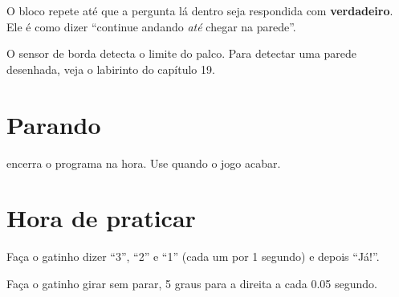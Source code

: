 O bloco  repete até que a pergunta lá dentro seja respondida com \textbf{verdadeiro}. Ele é como dizer ``continue andando \emph{até} chegar na parede''.

\begin{codigo}
\begin{pilha}
\sbcend
\end{pilha}
\end{codigo}

O sensor de borda detecta o limite do palco. Para detectar uma parede desenhada, veja o labirinto do capítulo 19.

\section{Parando}

 encerra o programa na hora. Use quando o jogo acabar.

\section{Hora de praticar}

\begin{exercicio}
Faça o gatinho dizer ``3'', ``2'' e ``1'' (cada um por 1 segundo) e depois ``Já!''.
\end{exercicio}

\begin{solucao}
\begin{pilha}
\end{pilha}
\end{solucao}

\begin{exercicio}
Faça o gatinho girar sem parar, 5 graus para a direita a cada 0.05 segundo.
\end{exercicio}

\begin{solucao}
\begin{pilha}
\sbcend
\end{pilha}
\end{solucao}

